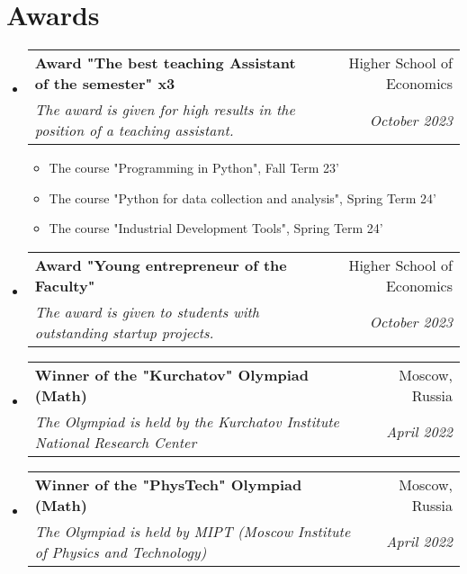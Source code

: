 \documentclass[letterpaper,11pt]{article}
\makeatletter
\newcommand{\resumeItem}[1]{
  \item\small{
    {#1 \vspace{-2pt}}
  }
}
\newcommand{\resumeSubheading}[4]{
  \vspace{-2pt}\item
    \begin{tabular*}{0.97\textwidth}[t]{l@{\extracolsep{\fill}}r}
      \textbf{#1} & #2 \\
      \textit{\small#3} & \textit{\small #4} \\
    \end{tabular*}\vspace{-7pt}
}
\newcommand{\resumeSubHeadingListStart}{\begin{itemize}[leftmargin=0.15in, label={}]}
\newcommand{\resumeSubHeadingListEnd}{\end{itemize}}
\newcommand{\resumeItemListStart}{\begin{itemize}}
\newcommand{\resumeItemListEnd}{\end{itemize}\vspace{-5pt}}
\makeatother
\begin{document}



\section{Awards}

  \resumeSubHeadingListStart
    \resumeSubheading
      {Award "The best teaching Assistant of the semester" x3}{Higher School of Economics}
      {The award is given for high results in the position of a teaching assistant.}{October 2023}
        \resumeItemListStart
            \resumeItem{The course "Programming in Python", Fall Term 23'}
            \resumeItem{The course "Python for data collection and analysis", Spring Term 24'}
            \resumeItem{The course "Industrial Development Tools", Spring Term 24'}
          \resumeItemListEnd

    \resumeSubheading
      {Award "Young entrepreneur of the Faculty"}{Higher School of Economics}
      {The award is given to students with outstanding startup projects.}{October 2023}

    \resumeSubheading
      {Winner of the "Kurchatov" Olympiad (Math)}{Moscow, Russia}
      {The Olympiad is held by the Kurchatov Institute National Research Center}{April 2022}

    \resumeSubheading
      {Winner of the "PhysTech" Olympiad (Math)}{Moscow, Russia}
      {The Olympiad is held by MIPT (Moscow Institute of Physics and Technology) }{April 2022}

  \resumeSubHeadingListEnd
\end{document}
